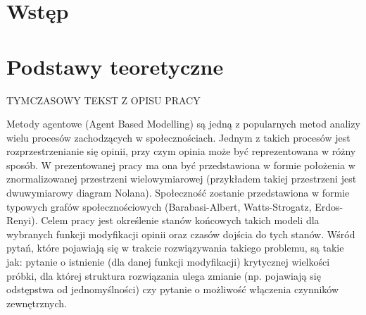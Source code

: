 \documentclass{wfiisul}
\begin{document}





\stronatytulowa



\chapter{Wstęp}




\chapter{Podstawy teoretyczne}

TYMCZASOWY TEKST Z OPISU PRACY

Metody agentowe (Agent Based Modelling) są jedną z popularnych metod analizy wielu procesów zachodzących w społecznościach. 
Jednym z takich procesów jest rozprzestrzenianie się opinii, przy czym opinia może być reprezentowana w różny sposób. 
W prezentowanej pracy ma ona być przedstawiona w formie położenia w znormalizowanej przestrzeni wielowymiarowej (przykładem takiej przestrzeni jest dwuwymiarowy diagram Nolana). 
Społeczność zostanie przedstawiona w formie typowych grafów społecznościowych (Barabasi-Albert, Watts-Strogatz, Erdos-Renyi). 
Celem pracy jest określenie stanów końcowych takich modeli dla wybranych funkcji modyfikacji opinii oraz czasów dojścia do tych stanów. 
Wśród pytań, które pojawiają się w trakcie rozwiązywania takiego problemu, są takie jak: 
pytanie o istnienie (dla danej funkcji modyfikacji) krytycznej wielkości próbki, dla której struktura rozwiązania ulega zmianie (np. pojawiają się odstępstwa od jednomyślności) 
czy pytanie o możliwość włączenia czynników zewnętrznych.
\end{document}
